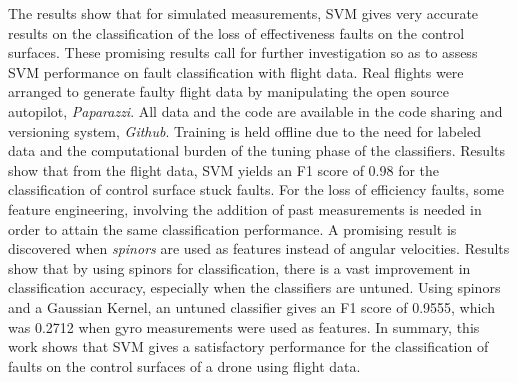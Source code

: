 The results show that for simulated measurements, SVM gives very accurate results on the classification of the loss of effectiveness faults on the control surfaces. 
These promising results call for further investigation so as to assess SVM performance on fault classification with flight data.
Real flights were arranged to generate faulty flight data by manipulating the open source autopilot, \emph{Paparazzi}. 
All data and the code are available in the code sharing and versioning system, \emph{Github}. 
Training is held offline due to the need for labeled data and the computational burden of the tuning phase of the classifiers. 
Results show that from the flight data, SVM yields an F1 score of 0.98 for the classification of control surface stuck faults.
For the loss of efficiency faults, some feature engineering, involving the addition of past measurements is needed in order to attain the same classification performance. 
A promising result is discovered when \emph{spinors} are used as features instead of angular velocities. 
Results show that by using spinors for classification, there is a vast improvement in classification accuracy, especially when the classifiers are untuned. Using spinors and a Gaussian Kernel, an untuned classifier gives an F1 score of 0.9555, which was 0.2712 when gyro measurements were used as features.
In summary, this work shows that SVM gives a satisfactory performance for the classification of faults on the control surfaces of a drone using flight data.
